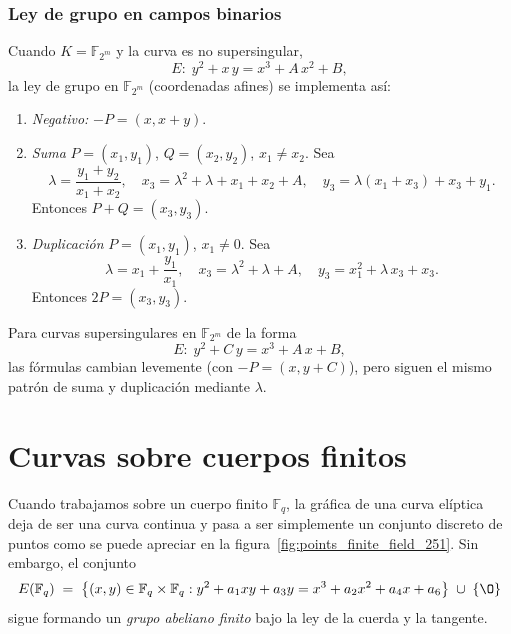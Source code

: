 \subsubsection*{Ley de grupo en campos binarios}

Cuando \(K = \mathbb{F}_{2^m}\) y la curva es no supersingular,
\[
  E\colon\;y^2 + x\,y = x^3 + A\,x^2 + B,
\]
la ley de grupo en \(\mathbb{F}_{2^m}\) (coordenadas afines) se implementa así:

\begin{enumerate}
  \item \emph{Negativo:} \(-P = (x,x+y)\).
  \item \emph{Suma} \(P=(x_1,y_1)\), \(Q=(x_2,y_2)\), \(x_1\neq x_2\). Sea
    \[
      \lambda = \frac{y_1 + y_2}{x_1 + x_2},\quad
      x_3 = \lambda^2 + \lambda + x_1 + x_2 + A,\quad
      y_3 = \lambda(x_1 + x_3) + x_3 + y_1.
    \]
    Entonces \(P + Q = (x_3,y_3)\).
  \item \emph{Duplicación} \(P=(x_1,y_1)\), \(x_1\neq0\). Sea
    \[
      \lambda = x_1 + \frac{y_1}{x_1},\quad
      x_3 = \lambda^2 + \lambda + A,\quad
      y_3 = x_1^2 + \lambda\,x_3 + x_3.
    \]
    Entonces \(2P = (x_3,y_3)\).
\end{enumerate}

Para curvas supersingulares en \(\mathbb{F}_{2^m}\) de la forma
\[
  E\colon\;y^2 + C\,y = x^3 + A\,x + B,
\]
las fórmulas cambian levemente (con \(-P=(x,y+C)\)), pero siguen el mismo patrón de suma y duplicación mediante \(\lambda\).

\section{Curvas sobre cuerpos finitos}\label{sec:curvas_sobre_cuerpos_finitos}
Cuando trabajamos sobre un cuerpo finito \(\mathbb{F}_q\), la gráfica de una curva elíptica deja de ser una curva continua y pasa a ser simplemente un conjunto discreto de puntos como se puede apreciar en la figura~\ref{fig:points_finite_field_251}. Sin embargo, el conjunto
\[
  E(\mathbb{F}_q)
  \;=\;
  \bigl\{(x,y)\in\mathbb{F}_q\times\mathbb{F}_q : y^2 + a_1xy + a_3y = x^3 + a_2x^2 + a_4x + a_6\bigr\}\;\cup\;\{\O\}
\]
sigue formando un \emph{grupo abeliano finito} bajo la ley de la cuerda y la tangente.

